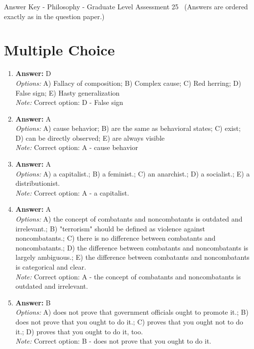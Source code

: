 \documentclass[12pt]{article}
\begin{document}
\begin{center}
Answer Key - Philosophy - Graduate Level Assessment 25 \
\small (Answers are ordered exactly as in the question paper.)
\end{center}

\section*{Multiple Choice}
\begin{enumerate}[label=\arabic*.]
\item \textbf{Answer:} D
\\ \textit{Options:} A) Fallacy of composition; B) Complex cause; C) Red herring; D) False sign; E) Hasty generalization
\\ \textit{Note:} Correct option: D - False sign
\item \textbf{Answer:} A
\\ \textit{Options:} A) cause behavior; B) are the same as behavioral states; C) exist; D) can be directly observed; E) are always visible
\\ \textit{Note:} Correct option: A - cause behavior
\item \textbf{Answer:} A
\\ \textit{Options:} A) a capitalist.; B) a feminist.; C) an anarchist.; D) a socialist.; E) a distributionist.
\\ \textit{Note:} Correct option: A - a capitalist.
\item \textbf{Answer:} A
\\ \textit{Options:} A) the concept of combatants and noncombatants is outdated and irrelevant.; B) "terrorism" should be defined as violence against noncombatants.; C) there is no difference between combatants and noncombatants.; D) the difference between combatants and noncombatants is largely ambiguous.; E) the difference between combatants and noncombatants is categorical and clear.
\\ \textit{Note:} Correct option: A - the concept of combatants and noncombatants is outdated and irrelevant.
\item \textbf{Answer:} B
\\ \textit{Options:} A) does not prove that government officials ought to promote it.; B) does not prove that you ought to do it.; C) proves that you ought not to do it.; D) proves that you ought to do it, too.
\\ \textit{Note:} Correct option: B - does not prove that you ought to do it.
\end{enumerate}
\end{document}
